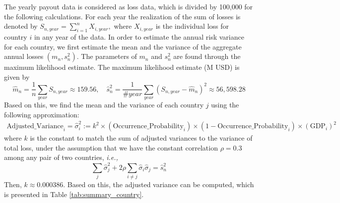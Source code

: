 \documentclass[fleqn,mnsc,nonblindrev]{informs4}
\begin{document}
The yearly payout data is considered as loss data, which is divided by 100,000 for the following calculations. For each year the realization of the sum of losses is denoted by $S_{n,year}=\sum_{i=1}^nX_{i,year},$ where $X_{i,year}$ is the individual loss for country $i$ in any year of the data. In order to estimate the annual risk variance for each country, we first estimate the mean and the variance of the aggregate annual losses $(m_n,s_n^2).$ The parameters of $m_n$ and $s_n^2$ are found through the maximum likelihood estimate. The maximum likelihood estimate (M USD) is given by 
\[
\hat{m}_n = \frac{1}{n} \sum_{year}^{} S_{n,year}\approx 159.56,\quad \hat{s}^2_n = \frac{1}{\#year} \sum_{year}^{} (S_{n,year} - \hat{m}_n)^2\approx56,598.28
\]
Based on this, we find the mean and the variance of each country $j$ using the following approximation:
    {
\begin{align*}
\text{Adjusted\_Variance}_i =\hat{\sigma}_i^2:= k^2 \times \left(\text{Occurrence\_Probability}_i\right)\times \left(1-\text{Occurrence\_Probability}_i\right) \times \left(\text{GDP}_i\right)^2
\end{align*}
}
where $k$ is the constant to match the sum of adjusted variances to the variance of total loss, under the assumption that we have the constant correlation $\rho=0.3$ among any pair of two countries, {\it i.e.,} 
\[ \sum_{j}\hat{\sigma}_j^2+2\rho\sum_{i\neq j}\hat{\sigma}_i\hat{\sigma}_j= \hat{s}_n^2
\]
Then,     {$k\approx 0.000386.$} Based on this, the adjusted variance can be computed, which is presented in Table \ref{tab:summary_country}.
\end{document}
